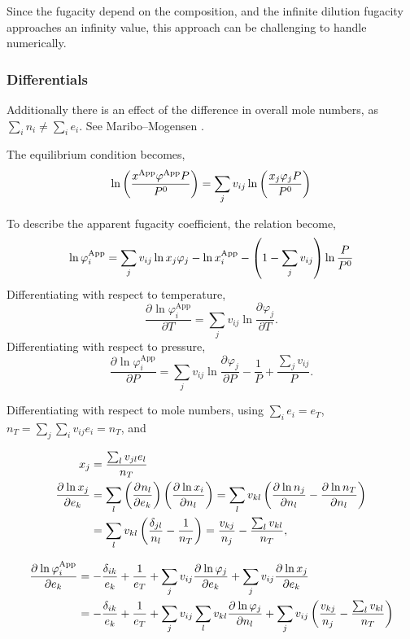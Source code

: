 \documentclass[internal,english]{sintefmemo2012}
\newcommand*{\pd}[3][]{\frac{\partial^{#1}#2}{\partial{#3}^{#1}}}%
\newcommand{\lp}{\ensuremath{\left(}\xspace}
\newcommand{\rp}{\ensuremath{\right)}\xspace}
\newcommand{\app}{\ensuremath{\text{App}}\xspace}
\begin{document}
Since the fugacity depend on the composition, and the infinite
dilution fugacity approaches an infinity value, this approach can be
challenging to handle numerically.

\subsubsection{Differentials}
Additionally there is an effect of the difference in overall mole
numbers, as $\sum_i n_i \neq \sum_i e_i$. See Maribo--Mogensen
\cite[App. C.3]{Mogensen2014}.

The equilibrium condition becomes,
\begin{equation}
  \ln \lp \frac{x^\app \varphi^\app P}{P^0} \rp  = \sum_j v_{ij} \ln \lp \frac{x_j \varphi_j P}{P^0} \rp
\label{eq:fugacity}
\end{equation}

To describe the apparent fugacity coefficient, the relation become,
\begin{equation}
  \ln \varphi^\app_i  = \sum_j v_{ij} \ln x_j \varphi_j - \ln x_i^\app - \lp 1 - \sum_j v_{ij} \rp \ln \frac{P}{P^0}
\label{eq:fugacity_coeff_app}
\end{equation}
Differentiating with respect to temperature,
\begin{equation}
  \pd{\ln \varphi^\app_i}{T}  = \sum_j v_{ij} \ln \pd{\varphi_j}{T}.
\label{eq:fugacity_coeff_app_T}
\end{equation}
Differentiating with respect to pressure,
\begin{equation}
  \pd{\ln \varphi^\app_i}{P}  = \sum_j v_{ij} \ln \pd{\varphi_j}{P} - \frac{1}{P} + \frac{\sum_j v_{ij}}{P}.
\label{eq:fugacity_coeff_app_P}
\end{equation}

Differentiating with respect to mole numbers, using $\sum_i e_i = e_T$,
$n_T = \sum_j \sum_i v_{ij} e_i = n_T$, and

\begin{align}
  x_j  &= \frac{\sum_l v_{jl} e_l}{n_T}\\
  \pd{\ln x_j}{e_k} &= \sum_l \lp\pd{n_l}{e_k}\rp \lp \pd{\ln x_i}{n_l} \rp = \sum_l v_{kl} \lp \pd{\ln n_j}{n_l} -\pd{\ln n_T}{n_l} \rp \nonumber \\
  &= \sum_l v_{kl} \lp \frac{\delta_{jl}}{n_l} - \frac{1}{n_T} \rp = \frac{v_{kj}}{n_j} - \frac{\sum_l v_{kl}}{n_T},
\label{eq:x_ion}
\end{align}

\begin{align}
  \pd{\ln \varphi^\app_i}{e_k}  &= - \frac{\delta_{ik}}{e_k} + \frac{1}{e_T} + \sum_j v_{ij} \pd{\ln \varphi_j}{e_k} + \sum_j v_{ij} \pd{\ln x_j}{e_k} \nonumber \\
  &= - \frac{\delta_{ik}}{e_k} + \frac{1}{e_T} + \sum_j v_{ij} \sum_l v_{kl} \pd{\ln \varphi_j}{n_l} + \sum_j v_{ij} \lp \frac{v_{kj}}{n_j} - \frac{\sum_l v_{kl}}{n_T} \rp
\label{eq:fugacity_coeff_app_n}
\end{align}
\end{document}
